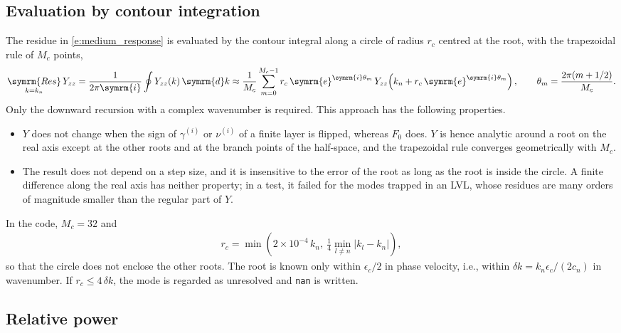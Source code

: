 \documentclass[a4paper, 10pt]{article}
\begin{document}
\subsection{Evaluation by contour integration}

The residue in \eqref{e:medium_response} is evaluated by the contour integral along a circle of radius $r_c$ centred at the root, with the trapezoidal rule of $M_c$ points,
\begin{align}
  \mathop{\symrm{Res}}_{k = k_n} Y_{zz}
  = \frac{1}{2 \pi \symrm{i}} \oint Y_{zz}(k)\, \symrm{d}k
  \approx \frac{1}{M_c} \sum_{m = 0}^{M_c - 1}
  r_c\, \symrm{e}^{\symrm{i} \theta_m}\, Y_{zz}\!\left( k_n + r_c\, \symrm{e}^{\symrm{i} \theta_m} \right),
  \qquad
  \theta_m = \frac{2 \pi (m + 1/2)}{M_c}.
\end{align}
Only the downward recursion with a complex wavenumber is required.
This approach has the following properties.
\begin{itemize}
  \item $Y$ does not change when the sign of $\gamma^{(i)}$ or $\nu^{(i)}$ of a finite layer is flipped, whereas $F_0$ does. $Y$ is hence analytic around a root on the real axis except at the other roots and at the branch points of the half-space, and the trapezoidal rule converges geometrically with $M_c$.
  \item The result does not depend on a step size, and it is insensitive to the error of the root as long as the root is inside the circle. A finite difference along the real axis has neither property; in a test, it failed for the modes trapped in an LVL, whose residues are many orders of magnitude smaller than the regular part of $Y$.
\end{itemize}
In the code, $M_c = 32$ and
\begin{align}
  r_c = \min \left( 2 \times 10^{-4}\, k_n,\ \frac{1}{4} \min_{l \neq n} \left| k_l - k_n \right| \right),
\end{align}
so that the circle does not enclose the other roots.
The root is known only within $\epsilon_c / 2$ in phase velocity, i.e., within $\delta k = k_n \epsilon_c / (2 c_n)$ in wavenumber.
If $r_c \leq 4\, \delta k$, the mode is regarded as unresolved and \texttt{nan} is written.

\subsection{Relative power}
\end{document}
